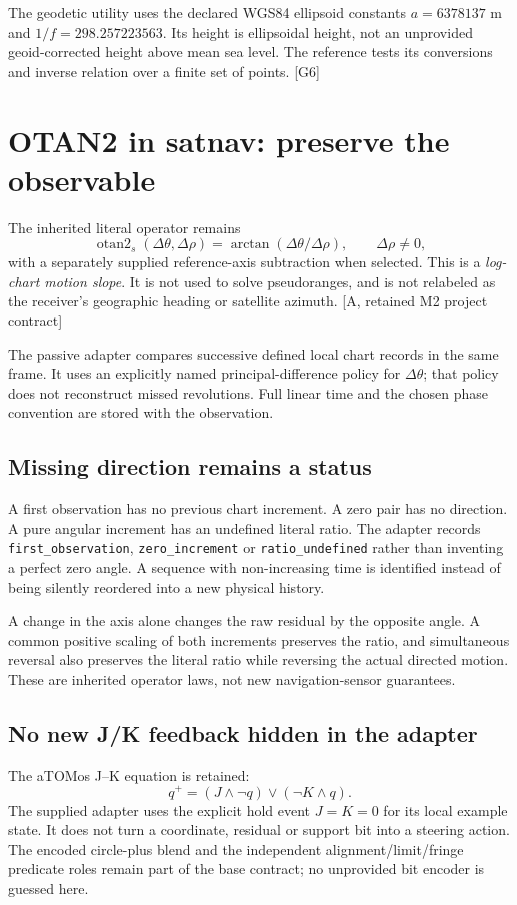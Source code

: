 \documentclass[11pt,a4paper]{article}
\newcommand{\code}[1]{\texttt{#1}}
\newcommand{\base}{\textcolor{muted}{[A, retained M2 project contract]}}
\newcommand{\ext}[1]{\textcolor{muted}{[#1]}}
\newcommand{\ot}{\operatorname{otan2}}
\begin{document}
The geodetic utility uses the declared WGS84 ellipsoid constants $a=6378137$ m and
$1/f=298.257223563$. Its height is ellipsoidal height, not an unprovided geoid-corrected
height above mean sea level. The reference tests its conversions and inverse relation
over a finite set of points. \ext{G6}
\clearpage

\section{OTAN2 in satnav: preserve the observable}
The inherited literal operator remains
\begin{equation}
\ot_s(\Delta\theta,\Delta\rho)=\arctan(\Delta\theta/\Delta\rho),
\qquad \Delta\rho\ne0,
\end{equation}
with a separately supplied reference-axis subtraction when selected. This is a
\emph{log-chart motion slope}. It is not used to solve pseudoranges, and is not
relabeled as the receiver's geographic heading or satellite azimuth. \base

The passive adapter compares successive defined local chart records in the same
frame. It uses an explicitly named principal-difference policy for $\Delta\theta$;
that policy does not reconstruct missed revolutions. Full linear time and the
chosen phase convention are stored with the observation.

\subsection{Missing direction remains a status}
A first observation has no previous chart increment. A zero pair has no direction.
A pure angular increment has an undefined literal ratio. The adapter records
\code{first\_observation}, \code{zero\_increment} or \code{ratio\_undefined} rather
than inventing a perfect zero angle. A sequence with non-increasing time is identified
instead of being silently reordered into a new physical history.

A change in the axis alone changes the raw residual by the opposite angle. A common
positive scaling of both increments preserves the ratio, and simultaneous reversal
also preserves the literal ratio while reversing the actual directed motion. These
are inherited operator laws, not new navigation-sensor guarantees.

\subsection{No new J/K feedback hidden in the adapter}
The aTOMos J--K equation is retained:
\begin{equation}
q^+=(J\land\neg q)\lor(\neg K\land q).
\end{equation}
The supplied adapter uses the explicit hold event $J=K=0$ for its local example state.
It does not turn a coordinate, residual or support bit into a steering action. The
encoded circle-plus blend and the independent alignment/limit/fringe predicate roles
remain part of the base contract; no unprovided bit encoder is guessed here.
\end{document}
